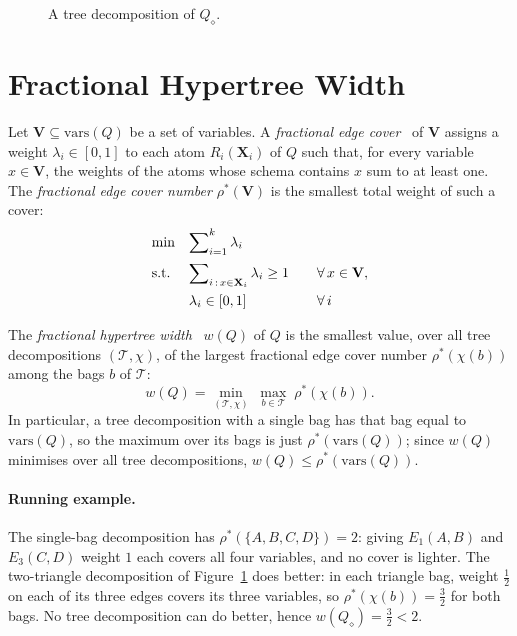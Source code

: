 \begin{figure}[ht]
  \centering
  \caption{A tree decomposition of $Q_\diamond$.}
  \label{fig:diamond_td}
\end{figure}

\section{Fractional Hypertree Width}
\label{sec:fhw}

Let $\mathbf{V} \subseteq \mathrm{vars}(Q)$ be a set of variables.
A \emph{fractional edge cover}~\cite{atserias2013} of $\mathbf{V}$ assigns a weight $\lambda_i \in [0,1]$ to each atom $R_i(\mathbf{X}_i)$ of $Q$ such that, for every variable $x \in \mathbf{V}$, the weights of the atoms whose schema contains $x$ sum to at least one.
The \emph{fractional edge cover number} $\rho^\ast(\mathbf{V})$ is the smallest total weight of such a cover:
\[
\begin{array}{@{}ll@{\qquad}l@{}}
\text{min}   & \displaystyle \sum\nolimits_{i=1}^{k} \lambda_i & \\[8pt]
\text{s.t.} & \displaystyle \sum\nolimits_{i\,:\, x \in \mathbf{X}_i} \lambda_i \geq 1 & \forall\, x \in \mathbf{V}, \\[8pt]
                  & \lambda_i \in [0,1] & \forall\, i
\end{array}
\]

\medskip

The \emph{fractional hypertree width}~\cite{grohe2014} $w(Q)$ of $Q$ is the smallest value, over all tree decompositions $(\mathcal{T}, \chi)$, of the largest fractional edge cover number $\rho^\ast(\chi(b))$ among the bags $b$ of $\mathcal{T}$:
\[
w(Q) = \min_{(\mathcal{T}, \chi)} \; \max_{b \in \mathcal{T}} \; \rho^\ast(\chi(b)).
\]
In particular, a tree decomposition with a single bag has that bag equal to $\mathrm{vars}(Q)$, so the maximum over its bags is just $\rho^\ast(\mathrm{vars}(Q))$; since $w(Q)$ minimises over all tree decompositions, $w(Q) \le \rho^\ast(\mathrm{vars}(Q))$.

\paragraph{Running example.}
The single-bag decomposition has $\rho^\ast(\{A,B,C,D\}) = 2$: giving $E_1(A,B)$ and $E_3(C,D)$ weight $1$ each covers all four variables, and no cover is lighter.
The two-triangle decomposition of Figure~\ref{fig:diamond_td} does better: in each triangle bag, weight $\tfrac12$ on each of its three edges covers its three variables, so $\rho^\ast(\chi(b)) = \tfrac{3}{2}$ for both bags.
No tree decomposition can do better, hence $w(Q_\diamond) = \tfrac{3}{2} < 2$.

